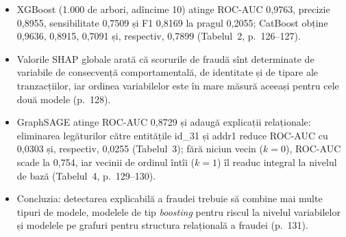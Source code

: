 \textbf{}
\begin{itemize}
\item {}%
{XGBoost (1.000 de arbori, adîncime 10) atinge ROC-AUC 0,9763, precizie 0,8955, sensibilitate 0,7509 și F1 0,8169 la pragul 0,2055; CatBoost obține 0,9636, 0,8915, 0,7091 și, respectiv, 0,7899 (Tabelul~2, p.~126--127).}
\item {}%
{Valorile SHAP globale arată că scorurile de fraudă sînt determinate de variabile de consecvență comportamentală, de identitate și de tipare ale tranzacțiilor, iar ordinea variabilelor este în mare măsură aceeași pentru cele două modele (p.~128).}
\item {}%
{GraphSAGE atinge ROC-AUC 0,8729 și adaugă explicații relaționale: eliminarea legăturilor către entitățile id\_31 și addr1 reduce ROC-AUC cu 0,0303 și, respectiv, 0,0255 (Tabelul~3); fără niciun vecin ($k=0$), ROC-AUC scade la 0,754, iar vecinii de ordinul întîi ($k=1$) îl readuc integral la nivelul de bază (Tabelul~4, p.~129--130).}
\item {}%
{Concluzia: detectarea explicabilă a fraudei trebuie să combine mai multe tipuri de modele, modelele de tip \emph{boosting} pentru riscul la nivelul variabilelor și modelele pe grafuri pentru structura relațională a fraudei (p.~131).}
\end{itemize}

